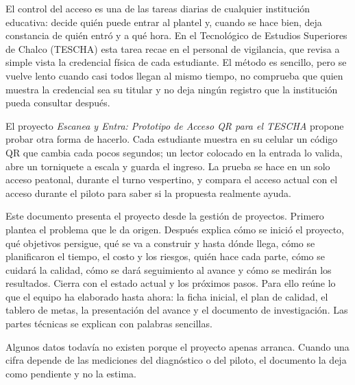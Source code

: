 El control del acceso es una de las tareas diarias de cualquier institución
educativa: decide quién puede entrar al plantel y, cuando se hace bien, deja
constancia de quién entró y a qué hora. En el Tecnológico de Estudios
Superiores de Chalco (TESCHA) esta tarea recae en el personal de vigilancia,
que revisa a simple vista la credencial física de cada estudiante. El método
es sencillo, pero se vuelve lento cuando casi todos llegan al mismo tiempo, no
comprueba que quien muestra la credencial sea su titular y no deja ningún
registro que la institución pueda consultar después.

El proyecto \textit{Escanea y Entra: Prototipo de Acceso QR para el TESCHA}
propone probar otra forma de hacerlo. Cada estudiante muestra en su celular un
código QR que cambia cada pocos segundos; un lector colocado en la entrada lo
valida, abre un torniquete a escala y guarda el ingreso. La prueba se hace en
un solo acceso peatonal, durante el turno vespertino, y compara el acceso
actual con el acceso durante el piloto para saber si la propuesta realmente
ayuda.

Este documento presenta el proyecto desde la gestión de proyectos. Primero
plantea el problema que le da origen. Después explica cómo se inició el
proyecto, qué objetivos persigue, qué se va a construir y hasta dónde llega,
cómo se planificaron el tiempo, el costo y los riesgos, quién hace cada parte,
cómo se cuidará la calidad, cómo se dará seguimiento al avance y cómo se
medirán los resultados. Cierra con el estado actual y los próximos pasos. Para
ello reúne lo que el equipo ha elaborado hasta ahora: la ficha inicial, el
plan de calidad, el tablero de metas, la presentación del avance y el
documento de investigación. Las partes técnicas se explican con palabras
sencillas.

Algunos datos todavía no existen porque el proyecto apenas arranca. Cuando
una cifra depende de las mediciones del diagnóstico o del piloto, el documento
la deja como pendiente y no la estima.

